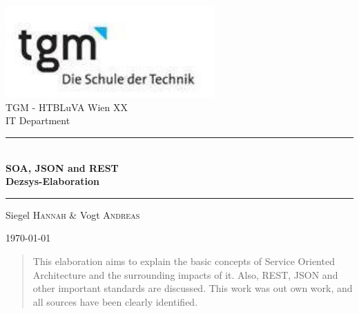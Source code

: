 \documentclass[12pt]{article}
\begin{document}
\begin{titlepage}
\begin{center}
\includegraphics[width=0.6\textwidth]{images/logo}\\[1cm]    



\LARGE TGM - HTBLuVA Wien XX \\ IT Department  \\[1.5cm]

\rule{1.0\textwidth}{1mm}
{ \huge \bfseries \\[0.4cm]  \huge SOA, JSON and REST \\ \LARGE Dezsys-Elaboration \\[0.4cm] }

\rule{1.0\textwidth}{1mm}


\noindent 
\vspace{0.5cm}


\small
\begin{center}
\large
Siegel \textsc{Hannah} \&
Vogt \textsc{Andreas}
\end{center}

{\large \today}
\normalsize
\vfill
\begin{abstract}\noindent This elaboration aims to explain the basic concepts of Service Oriented Architecture and the surrounding impacts of it. Also, REST, JSON and other important standards are discussed. This work was out own work, and all sources have been clearly identified.
\end{abstract}

\end{center}
\end{titlepage}

{\small\tableofcontents}

\printglossaries

\ohead{\headmark}

\newpage
\end{document}
